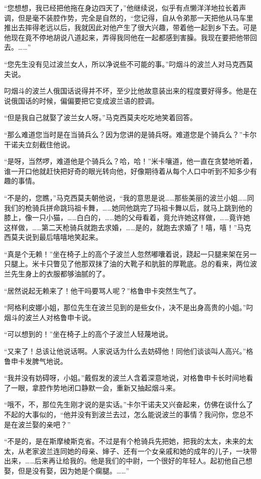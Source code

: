 \par “您想想，我已经把他拖在身边四天了，”他继续说，似乎有点懒洋洋地拉长着声调，但是毫不装腔作势，完全是自然的，“您记得，自从令弟那一天把他从马车里推出去摔得老远以后，我就因此对他产生了很大兴趣，带着他一起到乡下去。可是他现在竟不停地胡说八道起来，弄得我同他在一起都感到害臊。我现在要把他带回去。……”
\par “您先生没有见过波兰女人，所以净说些不可能的事。”叼烟斗的波兰人对马克西莫夫说。
\par 叼烟斗的波兰人俄国话说得并不坏，至少比他故意装出来的程度要好得多。他是在说俄国话的时候，偏偏要把它变成波兰语的腔调。
\par “但是我自己就娶了波兰女人呀。”马克西莫夫吃吃地笑着回答。
\par “那么难道您当时是在当骑兵么？因为您讲的是骑兵呀。难道您是个骑兵么？”卡尔干诺夫立刻截住他说。
\par “是呀，当然啰，难道他是个骑兵么？哈，哈！”米卡嚷道，他一直在贪婪地听着，谁一开口他就赶快把好奇的眼光转向他，好像期待着从每个人口中听到不知多少有趣的事情。
\par “不是的，您瞧，”马克西莫夫朝他说，“我的意思是说……那些美丽的波兰小姐……同我们的枪骑兵拼命跳玛祖卡舞，……她同他跳完了玛祖卡舞以后，就马上跳到他的膝上，像一只小猫，……白白的，……她的父母看着，竟允许她这样做，……竟许她这样做，……第二天枪骑兵就跑去求婚，……是的，就跑去求婚了！嘻，嘻！”马克西莫夫说到最后嘻嘻地笑起来。
\par “真是个无赖！”坐在椅子上的高个子波兰人忽然嘟囔着说，跷起一只腿来架在另一只腿上。米卡只瞥见了他那双抹了油的大靴子和肮脏的厚靴底。总的看来，两位波兰先生身上的衣服都够油腻的了。
\par “居然说起无赖来了！他干吗要骂人呢？”格鲁申卡突然生气了。
\par “阿格利皮娜小姐，那位先生在波兰见到的是些女仆，决不是出身高贵的小姐。”叼烟斗的波兰人对格鲁申卡说。
\par “可以想到的！”坐在椅子上的高个子波兰人轻蔑地说。
\par “又来了！总该让他说话啊。人家说话为什么去妨碍他！同他们谈谈叫人高兴。”格鲁申卡发脾气地说。
\par “我并没有妨碍呀，小姐。”戴假发的波兰人含着深意地说，对格鲁申卡长时间地看了一眼，拿腔作势地闭口静默一会，重新又抽起烟斗来。
\par “哦不，不，那位先生刚才说的是实话。”卡尔干诺夫又兴奋起来，仿佛在谈什么了不起的大事似的，“他并没有到波兰去过，怎么能说波兰的事情？我问你，您总不是在波兰娶的亲吧？”
\par “不是的，是在斯摩棱斯克省。不过是有个枪骑兵先把她，把我的太太，未来的太太，从老家波兰连同她的母亲、婶子、还有一个女亲戚和她的成年的儿子，一块带出来，……后来再让给我的。他是我们的中尉，一个很好的年轻人。起初他自己想娶，但是没有娶，因为她是个瘸腿。……”
